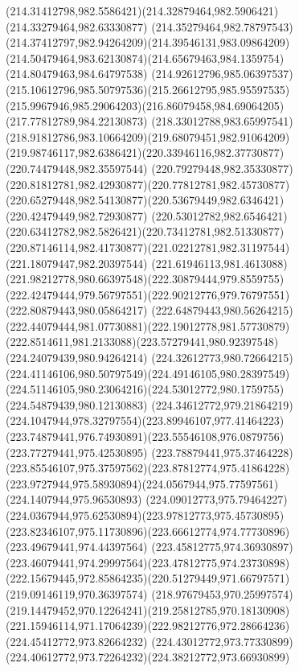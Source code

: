 {    \curveto(214.31412798,982.5586421)(214.32879464,982.5906421)(214.33279464,982.63330877)
    \curveto(214.35279464,982.78797543)(214.37412797,982.94264209)(214.39546131,983.09864209)
    \curveto(214.50479464,983.62130874)(214.65679463,984.1359754)(214.80479463,984.64797538)
    \curveto(214.92612796,985.06397537)(215.10612796,985.50797536)(215.26612795,985.95597535)
    \curveto(215.9967946,985.29064203)(216.86079458,984.69064205)(217.77812789,984.22130873)
    \curveto(218.33012788,983.65997541)(218.91812786,983.10664209)(219.68079451,982.91064209)
    \curveto(219.98746117,982.6386421)(220.33946116,982.37730877)(220.74479448,982.35597544)
    \curveto(220.79279448,982.35330877)(220.81812781,982.42930877)(220.77812781,982.45730877)
    \curveto(220.65279448,982.54130877)(220.53679449,982.6346421)(220.42479449,982.72930877)
    \curveto(220.53012782,982.6546421)(220.63412782,982.5826421)(220.73412781,982.51330877)
    \curveto(220.87146114,982.41730877)(221.02212781,982.31197544)(221.18079447,982.20397544)
    \curveto(221.61946113,981.4613088)(221.98212778,980.66397548)(222.30879444,979.8559755)
    \curveto(222.42479444,979.56797551)(222.90212776,979.76797551)(222.80879443,980.05864217)
    \curveto(222.64879443,980.56264215)(222.44079444,981.07730881)(222.19012778,981.57730879)
    \curveto(222.8514611,981.2133088)(223.57279441,980.92397548)(224.24079439,980.94264214)
    \curveto(224.32612773,980.72664215)(224.41146106,980.50797549)(224.49146105,980.28397549)
    \curveto(224.51146105,980.23064216)(224.53012772,980.1759755)(224.54879439,980.12130883)
    \curveto(224.34612772,979.21864219)(224.1047944,978.32797554)(223.89946107,977.41464223)
    \curveto(223.74879441,976.74930891)(223.55546108,976.0879756)(223.77279441,975.42530895)
    \curveto(223.78879441,975.37464228)(223.85546107,975.37597562)(223.87812774,975.41864228)
    \curveto(223.9727944,975.58930894)(224.0567944,975.77597561)(224.1407944,975.96530893)
    \curveto(224.09012773,975.79464227)(224.0367944,975.62530894)(223.97812773,975.45730895)
    \curveto(223.82346107,975.11730896)(223.66612774,974.77730896)(223.49679441,974.44397564)
    \curveto(223.45812775,974.36930897)(223.46079441,974.29997564)(223.47812775,974.23730898)
    \curveto(222.15679445,972.85864235)(220.51279449,971.66797571)(219.09146119,970.36397574)
    \curveto(218.97679453,970.25997574)(219.14479452,970.12264241)(219.25812785,970.18130908)
    \curveto(221.15946114,971.17064239)(222.98212776,972.28664236)(224.45412772,973.82664232)
    \curveto(224.43012772,973.77330899)(224.40612772,973.72264232)(224.38212772,973.66930899)
}

